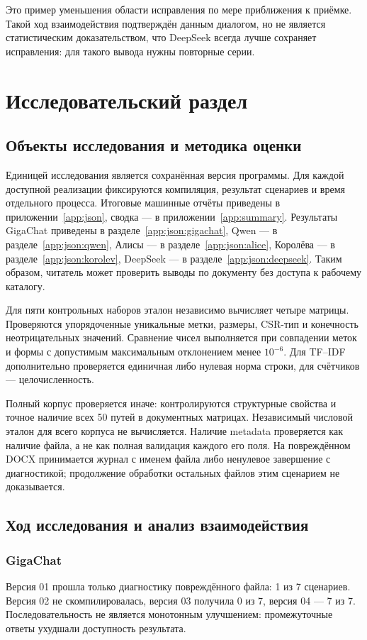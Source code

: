 Это пример уменьшения области исправления по мере приближения к приёмке. Такой ход взаимодействия подтверждён данным диалогом, но не является статистическим доказательством, что DeepSeek всегда лучше сохраняет исправления: для такого вывода нужны повторные серии.

\chapter{Исследовательский раздел}
\section{Объекты исследования и методика оценки}
Единицей исследования является сохранённая версия программы. Для каждой доступной реализации фиксируются компиляция, результат сценариев и время отдельного процесса. Итоговые машинные отчёты приведены в приложении~\ref{app:json}, сводка — в приложении~\ref{app:summary}. Результаты GigaChat приведены в разделе~\ref{app:json:gigachat}, Qwen — в разделе~\ref{app:json:qwen}, Алисы — в разделе~\ref{app:json:alice}, Королёва — в разделе~\ref{app:json:korolev}, DeepSeek — в разделе~\ref{app:json:deepseek}. Таким образом, читатель может проверить выводы по документу без доступа к рабочему каталогу.

Для пяти контрольных наборов эталон независимо вычисляет четыре матрицы. Проверяются упорядоченные уникальные метки, размеры, CSR-тип и конечность неотрицательных значений. Сравнение чисел выполняется при совпадении меток и формы с допустимым максимальным отклонением менее $10^{-6}$. Для TF--IDF дополнительно проверяется единичная либо нулевая норма строки, для счётчиков — целочисленность.

Полный корпус проверяется иначе: контролируются структурные свойства и точное наличие всех 50 путей в документных матрицах. Независимый числовой эталон для всего корпуса не вычисляется. Наличие metadata проверяется как наличие файла, а не как полная валидация каждого его поля. На повреждённом DOCX принимается журнал с именем файла либо ненулевое завершение с диагностикой; продолжение обработки остальных файлов этим сценарием не доказывается.

\section{Ход исследования и анализ взаимодействия}
\subsection{GigaChat}
Версия 01 прошла только диагностику повреждённого файла: 1 из 7 сценариев. Версия 02 не скомпилировалась, версия 03 получила 0 из 7, версия 04 — 7 из 7. Последовательность не является монотонным улучшением: промежуточные ответы ухудшали доступность результата.

